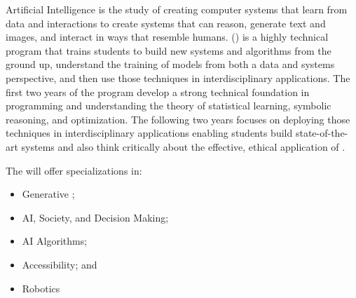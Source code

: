 Artificial Intelligence is the study of creating computer systems that
learn from data and interactions to create systems that can reason,
generate text and images, and interact in ways that resemble humans.
%
\name{} (\short{}) is a highly technical program that trains
students to build new \ai{} systems and algorithms from the ground up, understand the
training of models from both a data and systems perspective, and then
use those techniques in interdisciplinary applications.
%
The first two years of the program develop a strong technical
foundation in programming and understanding the theory of statistical
learning, symbolic reasoning, and optimization.
%
The following two years focuses on deploying those techniques in
interdisciplinary applications enabling students build state-of-the-art \ai{} systems and also think critically
about the effective, ethical application of \ai{}.

The \bsai{} will offer specializations in:
\begin{itemize}
    \item Generative \ai{};
    \item AI, Society, and Decision Making;
    \item AI Algorithms;
    \item Accessibility; and
    \item Robotics
\end{itemize}